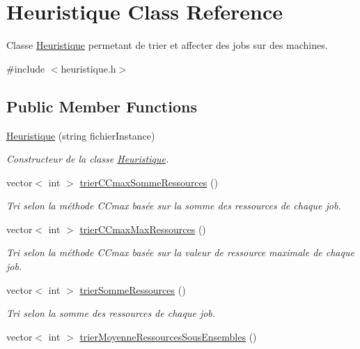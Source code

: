 \hypertarget{classHeuristique}{}\section{Heuristique Class Reference}
\label{classHeuristique}


Classe \hyperlink{classHeuristique}{Heuristique} permetant de trier et affecter des jobs sur des machines.  




{\ttfamily \#include $<$heuristique.\+h$>$}

\subsection*{Public Member Functions}
\begin{DoxyCompactItemize}
\item 
\hyperlink{classHeuristique_a58630433c6bac8eec9a5888945eba479}{Heuristique} (string fichier\+Instance)
\begin{DoxyCompactList}\small\item\em Constructeur de la classe \hyperlink{classHeuristique}{Heuristique}. \end{DoxyCompactList}\item 
vector$<$ int $>$ \hyperlink{classHeuristique_a19705558bc45437d88b750fe9cbe6125}{trier\+C\+Cmax\+Somme\+Ressources} ()
\begin{DoxyCompactList}\small\item\em Tri selon la méthode C\+Cmax basée sur la somme des ressources de chaque job. \end{DoxyCompactList}\item 
vector$<$ int $>$ \hyperlink{classHeuristique_a1fb7501d952a428b817ad179bc2a2185}{trier\+C\+Cmax\+Max\+Ressources} ()
\begin{DoxyCompactList}\small\item\em Tri selon la méthode C\+Cmax basée sur la valeur de ressource maximale de chaque job. \end{DoxyCompactList}\item 
vector$<$ int $>$ \hyperlink{classHeuristique_a019587ee3112631f8369d8ffe6303f2c}{trier\+Somme\+Ressources} ()
\begin{DoxyCompactList}\small\item\em Tri selon la somme des ressources de chaque job. \end{DoxyCompactList}\item 
vector$<$ int $>$ \hyperlink{classHeuristique_a9a5a00a6b2a9f0dc792491df1d7b6c67}{trier\+Moyenne\+Ressources\+Sous\+Ensembles} ()

\end{DoxyCompactItemize}

